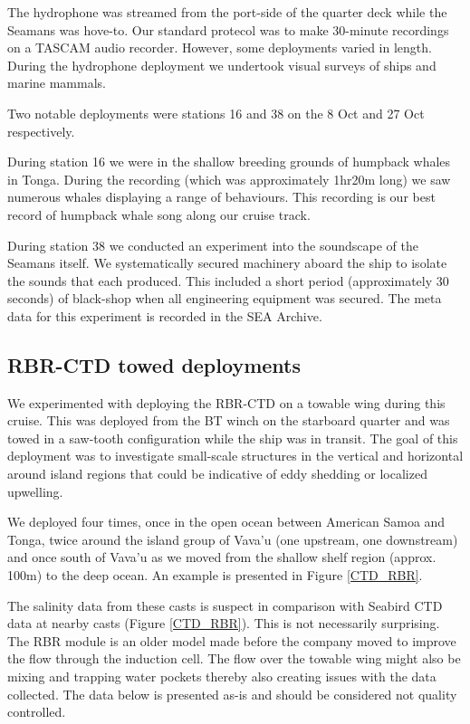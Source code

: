 \documentclass[letterpaper,11pt]{article}
\begin{document}
The hydrophone was streamed from the port-side of the quarter deck while the Seamans was hove-to. Our standard protecol was to make 30-minute recordings on a TASCAM audio recorder. However, some deployments varied in length. During the hydrophone deployment we undertook visual surveys of ships and marine mammals.

Two notable deployments were stations 16 and 38 on the 8 Oct and 27 Oct respectively.

During station 16 we were in the shallow breeding grounds of humpback whales in Tonga. During the recording (which was approximately 1hr20m long) we saw numerous whales displaying a range of behaviours. This recording is our best record of humpback whale song along our cruise track.

During station 38 we conducted an experiment into the soundscape of the Seamans itself. We systematically secured machinery aboard the ship to isolate the sounds that each produced. This included a short period (approximately 30 seconds) of black-shop when all engineering equipment was secured. The meta data for this experiment is recorded in the SEA Archive.

\subsection*{RBR-CTD towed deployments}

We experimented with deploying the RBR-CTD on a towable wing during this cruise. This was deployed from the BT winch on the starboard quarter and was towed in a saw-tooth configuration while the ship was in transit. The goal of this deployment was to investigate small-scale structures in the vertical and horizontal around island regions that could be indicative of eddy shedding or localized upwelling.

We deployed four times, once in the open ocean between American Samoa and Tonga, twice around the island group of Vava'u (one upstream, one downstream) and once south of Vava'u as we moved from the shallow shelf region (approx. 100m) to the deep ocean. An example is presented in Figure \ref{CTD_RBR}.

The salinity data from these casts is suspect in comparison with Seabird CTD data at nearby casts (Figure \ref{CTD_RBR}). This is not necessarily surprising. The RBR module is an older model made before the company moved to improve the flow through the induction cell. The flow over the towable wing might also be mixing and trapping water pockets thereby also creating issues with the data collected. The data below is presented as-is and should be considered not quality controlled.
\end{document}
